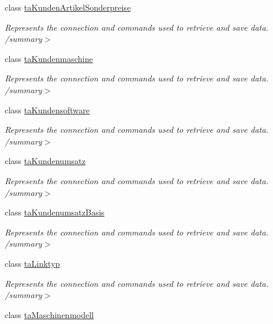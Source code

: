 \begin{DoxyCompactItemize}
class \hyperlink{class_products_1_1_data_1_1ds_sage_table_adapters_1_1ta_kunden_artikel_sonderpreise}{ta\+Kunden\+Artikel\+Sonderpreise}
\begin{DoxyCompactList}\small\item\em Represents the connection and commands used to retrieve and save data. /summary$>$ \end{DoxyCompactList}\item 
class \hyperlink{class_products_1_1_data_1_1ds_sage_table_adapters_1_1ta_kundenmaschine}{ta\+Kundenmaschine}
\begin{DoxyCompactList}\small\item\em Represents the connection and commands used to retrieve and save data. /summary$>$ \end{DoxyCompactList}\item 
class \hyperlink{class_products_1_1_data_1_1ds_sage_table_adapters_1_1ta_kundensoftware}{ta\+Kundensoftware}
\begin{DoxyCompactList}\small\item\em Represents the connection and commands used to retrieve and save data. /summary$>$ \end{DoxyCompactList}\item 
class \hyperlink{class_products_1_1_data_1_1ds_sage_table_adapters_1_1ta_kundenumsatz}{ta\+Kundenumsatz}
\begin{DoxyCompactList}\small\item\em Represents the connection and commands used to retrieve and save data. /summary$>$ \end{DoxyCompactList}\item 
class \hyperlink{class_products_1_1_data_1_1ds_sage_table_adapters_1_1ta_kundenumsatz_basis}{ta\+Kundenumsatz\+Basis}
\begin{DoxyCompactList}\small\item\em Represents the connection and commands used to retrieve and save data. /summary$>$ \end{DoxyCompactList}\item 
class \hyperlink{class_products_1_1_data_1_1ds_sage_table_adapters_1_1ta_linktyp}{ta\+Linktyp}
\begin{DoxyCompactList}\small\item\em Represents the connection and commands used to retrieve and save data. /summary$>$ \end{DoxyCompactList}\item 
class \hyperlink{class_products_1_1_data_1_1ds_sage_table_adapters_1_1ta_maschinenmodell}{ta\+Maschinenmodell}

\end{DoxyCompactItemize}
